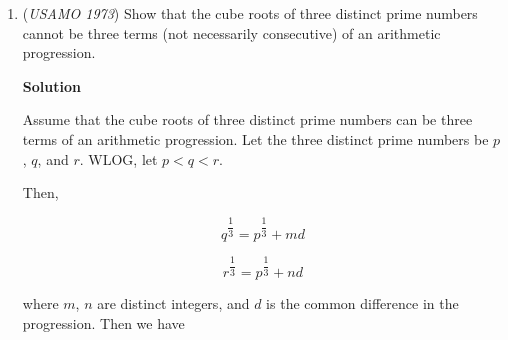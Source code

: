 \begin{enumerate}
 Equation 6 : $\prod(3-x) =8$

 Now let there be a cubic function $f(t)$ with the roots $x,y,z$ so from the relation between roots and coefficients,

 Equation 7 : $f(t)= t^3-3t^2+3t-d$   (As we don't know the product let the constant be $d$)

 As $f(t) = (t-x)(t-y)(t-z)$ then at $t=3$,

 Equation 8 : $f(3)=9-d=(3-x)(3-y)(3-z)$

 And from Eq(6),

 Equation 9 : $d= -1$

 So finally,

 Equation 10 : $f(t)=t^3-3t^2+3t-1=(t-1)^{3}$

 So, $\ (x,y,z)=(1,1,1)$
<i>Alternate solutions are always welcome. If you have a different, elegant solution to this problem, please \href{https://artofproblemsolving.com/wiki/index.php?title=1973\_USAMO\_Problems/Problem\_4&action=edit}{add it} to this page.</i>



	\item (\textit{USAMO 1973}) Show that the cube roots of three distinct prime numbers cannot be three terms (not necessarily consecutive) of an arithmetic progression.


 



\textbf{Solution}

Assume that the cube roots of three distinct prime numbers can be three terms of an arithmetic progression. Let the three distinct prime numbers be $p$, $q$, and $r.$ WLOG, let $p<q<r.$

 Then, 

 
 \[q^{\dfrac{1}{3}}=p^{\dfrac{1}{3}}+md\]

 \[r^{\dfrac{1}{3}}=p^{\dfrac{1}{3}}+nd\]

 where $m$, $n$ are distinct integers, and $d$ is the common difference in the progression. Then we have


\end{enumerate}
